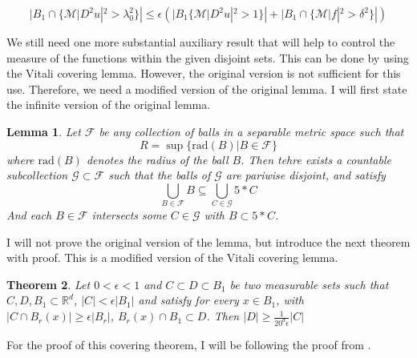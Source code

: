 \documentclass[12pt]{artikel1}
\newtheorem{theorem}{Theorem}[section]
\newtheorem{lemma}[theorem]{Lemma}
\begin{document}
\begin{equation*}
    |B_1\cap\{\mathcal{M}|D^2u|^2>\lambda_0^2\}|\leq\epsilon(|B_1\{\mathcal{M}|D^2u|^2>1\}|+|B_1\cap\{\mathcal{M}|f|^2>\delta^2\}|)
\end{equation*}

We still need one more substantial auxiliary result that will help to control the measure of the functions within the given disjoint sets. This can be done by using the Vitali covering lemma. However, the original version is not sufficient for this use. Therefore, we need a modified version of the original lemma. I will first state the infinite version of the original lemma.

\begin{lemma}
    Let $\mathcal{F}$ be any collection of balls in a separable metric space such that
    \begin{equation*}
        R=\sup\{\mathrm{rad}(B)|B\in \mathcal{F}\}
    \end{equation*}
    where $\mathrm{rad}(B)$ denotes the radius of the ball $B$. Then tehre exists a countable subcollection $\mathcal{G}\subset\mathcal{F}$ such that the balls of $\mathcal{G}$ are pariwise disjoint, and satisfy
    \begin{equation*}
        \bigcup_{B\in\mathcal{F}}B\subseteq\bigcup_{C\in\mathcal{G}}5*C
    \end{equation*}
    And each $B\in\mathcal{F}$ intersects some $C\in\mathcal{G}$ with $B\subset5*C$.
\end{lemma}

I will not prove the original version of the lemma, but introduce the next theorem with proof. This is a modified version of the Vitali covering lemma.

\begin{theorem}\label{thm:vitali}
    Let $0<\epsilon<1$ and $C\subset D\subset B_1$ be two measurable sets such that $C,D,B_1\subset\mathbb{R}^d$, $|C|<\epsilon |B_1|$ and satisfy for every $x\in B_1$, with $|C\cap B_r(x)|\geq\epsilon|B_r|$, $B_r(x)\cap B_1\subset D$. Then $|D|\geq\frac{1}{20^d\epsilon}|C|$
\end{theorem}

For the proof of this covering theorem, I will be following the proof from \cite{wang_geometric_2003}. 
\end{document}

